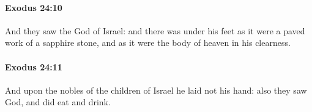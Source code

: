 		\paragraph{Exodus 24:10} %
			\label{EXODUS-24-10}

			And they saw the God of Israel: and there was under his feet as it were a paved work of a sapphire stone, and as it were the body of heaven in his clearness.


		\paragraph{Exodus 24:11} %
			\label{EXODUS-24-11}

			And upon the nobles of the children of Israel he laid not his hand: also they saw God, and did eat and drink.


